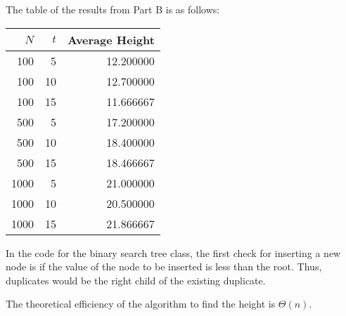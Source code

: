 \documentclass[letterpaper, 11pt]{article}
\begin{document}
The table of the results from Part B is as follows:
\begin{center}
\begin{tabular}{rrr}
  \(N\) &   \(t\) &  Average Height \\
    \hline
  100 &   5 &   12.200000 \\
  100 &  10 &   12.700000 \\
  100 &  15 &   11.666667 \\
  500 &   5 &   17.200000 \\
  500 &  10 &   18.400000 \\
  500 &  15 &   18.466667 \\
 1000 &   5 &   21.000000 \\
 1000 &  10 &   20.500000 \\
 1000 &  15 &   21.866667 \\
\end{tabular}
\end{center}

In the code for the binary search tree class, the first check for inserting a
new node is if the value of the node to be inserted is less than the root.
Thus, duplicates would be the right child of the existing duplicate.

The theoretical efficiency of the algorithm to find the height is
\(\Theta(n)\).
\end{document}
